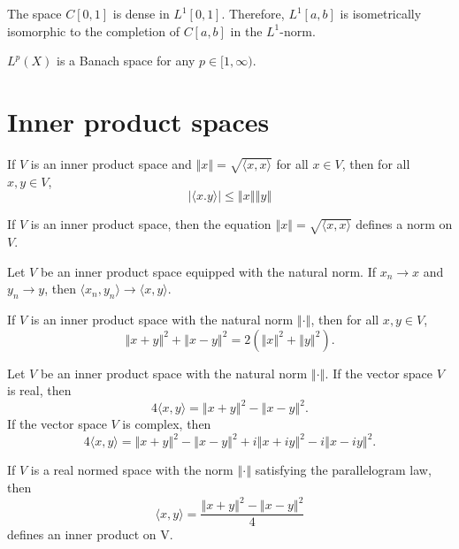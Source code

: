 \documentclass[a4paper]{article}
\newcommand{\norm}[1]{\left\Vert #1 \right\Vert}
\newcommand{\<}{\langle}
\renewcommand{\>}{\rangle}
\begin{document}
\begin{thm}
  The space $C[0,1]$ is dense in $L^1[0,1]$. Therefore, $L^1[a,b]$ is isometrically isomorphic to the completion of $C[a,b]$ in the $L^1$-norm.
\end{thm}

\begin{thm}
  $L^p(X)$ is a Banach space for any $p\in[1,\infty)$.
\end{thm}

\section{Inner product spaces}

\begin{lemma}
  If $V$ is an inner product space and $\norm{x}=\sqrt{\<x,x\>}$ for all $x\in V$, then for all $x,y\in V$,
  $$|\<x.y\>|\leq\norm{x}\norm{y}$$
\end{lemma}

\begin{prop}
  If $V$ is an inner product space, then the equation $\norm{x}=\sqrt{\<x,x\>}$ defines a norm on $V$.
\end{prop}

\begin{lemma}
  Let $V$ be an inner product space equipped with the natural norm. If $x_n\to x$ and $y_n\to y$, then $\<x_n,y_n\>\to\<x,y\>$.
\end{lemma}

\begin{lemma}
  If $V$ is an inner product space with the natural norm $\norm{\cdot}$, then for all $x,y\in V$,
  $$\norm{x+y}^2+\norm{x-y}^2 = 2(\norm{x}^2+\norm{y}^2).$$
\end{lemma}

\begin{lemma}
  Let $V$ be an inner product space with the natural norm $\norm{\cdot}$. If the vector space $V$ is real, then
  $$ 4\<x,y\> = \norm{x+y}^2 - \norm{x-y}^2.$$
  If the vector space $V$ is complex, then
  $$ 4\<x,y\> = \norm{x+y}^2 - \norm{x-y}^2 + i\norm{x+i y}^2 - i\norm{x-i y}^2.$$
\end{lemma}

\begin{prop}
  If $V$ is a real normed space with the norm $\norm{\cdot}$ satisfying the parallelogram law, then
  $$\<x,y\> = \frac{\norm{x+y}^2 - \norm{x-y}^2}{4}$$
  defines an inner product on V.
\end{prop}
\end{document}
